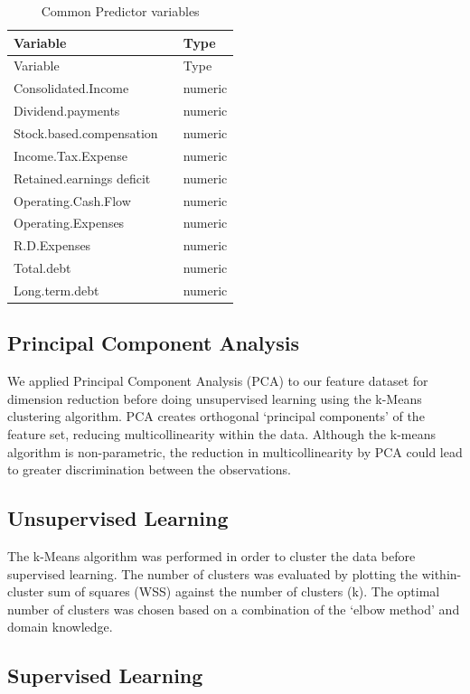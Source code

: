 \documentclass[11pt,]{article}
\begin{document}
\begin{longtable}[]{@{}lll@{}}
\caption{Common Predictor variables}\tabularnewline
\toprule
Variable & & Type\tabularnewline
\midrule
\endfirsthead
\toprule
Variable & & Type\tabularnewline
\midrule
\endhead
Consolidated.Income & & numeric\tabularnewline
Dividend.payments & & numeric\tabularnewline
Stock.based.compensation & & numeric\tabularnewline
Income.Tax.Expense & & numeric\tabularnewline
Retained.earnings deficit & & numeric\tabularnewline
Operating.Cash.Flow & & numeric\tabularnewline
Operating.Expenses & & numeric\tabularnewline
R.D.Expenses & & numeric\tabularnewline
Total.debt & & numeric\tabularnewline
Long.term.debt & & numeric\tabularnewline
\bottomrule
\end{longtable}

\hypertarget{principal-component-analysis}{%
\subsection{Principal Component
Analysis}\label{principal-component-analysis}}

We applied Principal Component Analysis (PCA) to our feature dataset for
dimension reduction before doing unsupervised learning using the k-Means
clustering algorithm. PCA creates orthogonal `principal components' of
the feature set, reducing multicollinearity within the data. Although
the k-means algorithm is non-parametric, the reduction in
multicollinearity by PCA could lead to greater discrimination between
the observations.

\hypertarget{unsupervised-learning}{%
\subsection{Unsupervised Learning}\label{unsupervised-learning}}

The k-Means algorithm was performed in order to cluster the data before
supervised learning. The number of clusters was evaluated by plotting
the within-cluster sum of squares (WSS) against the number of clusters
(k). The optimal number of clusters was chosen based on a combination of
the `elbow method' and domain knowledge.

\hypertarget{supervised-learning}{%
\subsection{Supervised Learning}\label{supervised-learning}}
\end{document}
